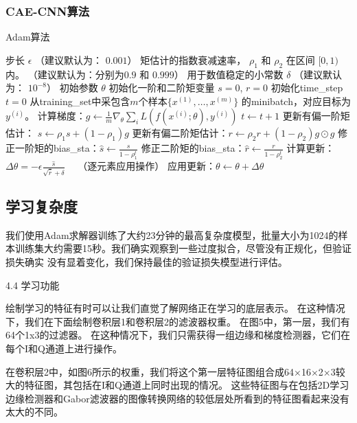 \subsubsection{CAE-CNN算法}


\begin{algorithm}[ht]
	\caption{Adam算法}
	\label{alg:adam}
	\begin{algorithmic}
		\REQUIRE 步长 $\epsilon$ （建议默认为： $0.001$）
		\REQUIRE 矩估计的指数衰减速率， $\rho_1$ 和 $\rho_2$ 在区间 $[0, 1)$内。
		（建议默认为：分别为$0.9$ 和 $0.999$）
		\REQUIRE 用于数值稳定的小常数 $\delta$  （建议默认为： $10^{-8}$）
		\REQUIRE 初始参数 $\theta$
		\STATE 初始化一阶和二阶矩变量 $s = 0 $, $r = 0$
		\STATE 初始化\gls{time_step} $t=0$ 
		\STATE 从\gls{training_set}中采包含$m$个样本$\{ x^{(1)},\dots, x^{(m)}\}$ 的\gls{minibatch}，对应目标为$y^{(i)}$。
		\STATE 计算梯度：$g \leftarrow \frac{1}{m} \nabla_{\theta} \sum_i L(f(x^{(i)};\theta),y^{(i)})$ 
		\STATE $t \leftarrow t + 1$
		\STATE 更新有偏一阶矩估计： $s \leftarrow \rho_1 s + (1-\rho_1) g$
		\STATE 更新有偏二阶矩估计：$r \leftarrow \rho_2 r + (1-\rho_2)  g \odot g$
		\STATE 修正一阶矩的\gls{bias_sta}：$\hat{s} \leftarrow \frac{s}{1-\rho_1^t}$
		\STATE 修正二阶矩的\gls{bias_sta}：$\hat{r} \leftarrow \frac{r}{1-\rho_2^t}$
		\STATE 计算更新：$\Delta \theta = - \epsilon \frac{\hat{s}}{\sqrt{\hat{r}} + \delta}$ \ \  （逐元素应用操作）
		\STATE 应用更新：$\theta \leftarrow \theta + \Delta \theta$
		\ENDWHILE
	\end{algorithmic}
\end{algorithm}

\subsection{学习复杂度}
我们使用Adam求解器训练了大约23分钟的最高复杂度模型，批量大小为1024的样本训练集大约需要15秒。我们确实观察到一些过度拟合，尽管没有正规化，但验证损失确实 没有显着变化，我们保持最佳的验证损失模型进行评估。\par
4.4 学习功能 \par
绘制学习的特征有时可以让我们直觉了解网络正在学习的底层表示。 在这种情况下，我们在下面绘制卷积层1和卷积层2的滤波器权重。 在图5中，第一层，我们有64个1x3的过滤器。 在这种情况下，我们只需获得一组边缘和梯度检测器，它们在每个I和Q通道上进行操作。\par

在卷积层2中，如图6所示的权重，我们将这个第一层特征图组合成64×16×2×3较大的特征图，其包括在I和Q通道上同时出现的情况。 这些特征图与在包括2D学习边缘检测器和Gabor滤波器的图像转换网络的较低层处所看到的特征图看起来没有太大的不同。\par


